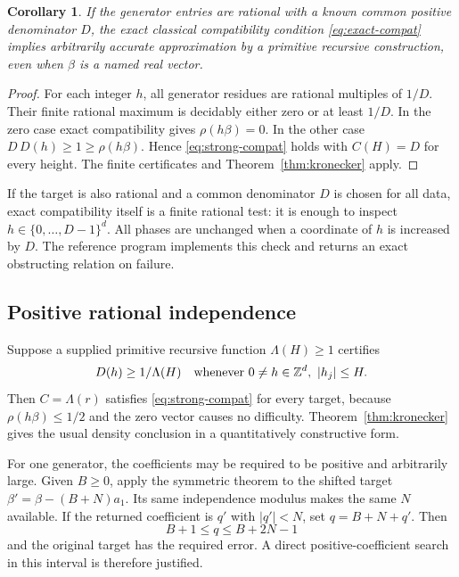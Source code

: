 \documentclass[11pt]{article}
\newtheorem{corollary}[theorem]{Corollary}
\theoremstyle{definition}\newtheorem{definition}[theorem]{Definition}
\theoremstyle{remark}\newtheorem{remark}[theorem]{Remark}
\begin{document}
\begin{corollary}\label{cor:rational}
If the generator entries are rational with a known common positive denominator $D$, the exact classical compatibility condition \eqref{eq:exact-compat} implies arbitrarily accurate approximation by a primitive recursive construction, even when $\beta$ is a named real vector.
\end{corollary}
\begin{proof}
For each integer $h$, all generator residues are rational multiples of $1/D$. Their finite rational maximum is decidably either zero or at least $1/D$. In the zero case exact compatibility gives $\rho(h\beta)=0$. In the other case $D\,D(h)\ge1\ge\rho(h\beta)$. Hence \eqref{eq:strong-compat} holds with $C(H)=D$ for every height. The finite certificates and Theorem~\ref{thm:kronecker} apply.
\end{proof}

If the target is also rational and a common denominator $D$ is chosen for all data, exact compatibility itself is a finite rational test: it is enough to inspect $h\in\{0,\ldots,D-1\}^d$. All phases are unchanged when a coordinate of $h$ is increased by $D$. The reference program implements this check and returns an exact obstructing relation on failure.

\subsection{Positive rational independence}

Suppose a supplied primitive recursive function $\Lambda(H)\ge1$ certifies
\begin{equation}\label{eq:independence}
 D(h)\ge1/\Lambda(H)
 \quad\text{whenever }0\ne h\in\mathbb Z^d,\ |h_j|\le H.
\end{equation}
Then $C=\Lambda(r)$ satisfies \eqref{eq:strong-compat} for every target, because $\rho(h\beta)\le1/2$ and the zero vector causes no difficulty. Theorem~\ref{thm:kronecker} gives the usual density conclusion in a quantitatively constructive form.

For one generator, the coefficients may be required to be positive and arbitrarily large. Given $B\ge0$, apply the symmetric theorem to the shifted target $\beta' = \beta-(B+N)a_1$. Its same independence modulus makes the same $N$ available. If the returned coefficient is $q'$ with $|q'|<N$, set $q=B+N+q'$. Then
\begin{equation}\label{eq:positiveq}
 B+1\le q\le B+2N-1
\end{equation}
and the original target has the required error. A direct positive-coefficient search in this interval is therefore justified.
\end{document}
